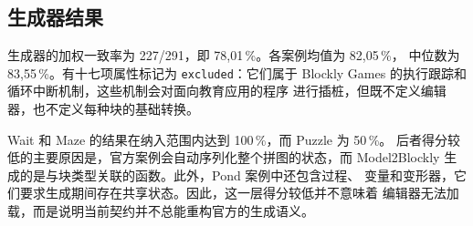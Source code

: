 \subsection{生成器结果}

生成器的加权一致率为 227/291，即 78,01\,\%。各案例均值为 82,05\,\%，
中位数为 83,55\,\%。有十七项属性标记为 \texttt{excluded}：它们属于
Blockly Games 的执行跟踪和循环中断机制，这些机制会对面向教育应用的程序
进行插桩，但既不定义编辑器，也不定义每种块的基础转换。

Wait 和 Maze 的结果在纳入范围内达到 100\,\%，而 Puzzle 为 50\,\%。
后者得分较低的主要原因是，官方案例会自动序列化整个拼图的状态，而
Model2Blockly 生成的是与块类型关联的函数。此外，Pond 案例中还包含过程、
变量和变形器，它们要求生成期间存在共享状态。因此，这一层得分较低并不意味着
编辑器无法加载，而是说明当前契约并不总能重构官方的生成语义。

